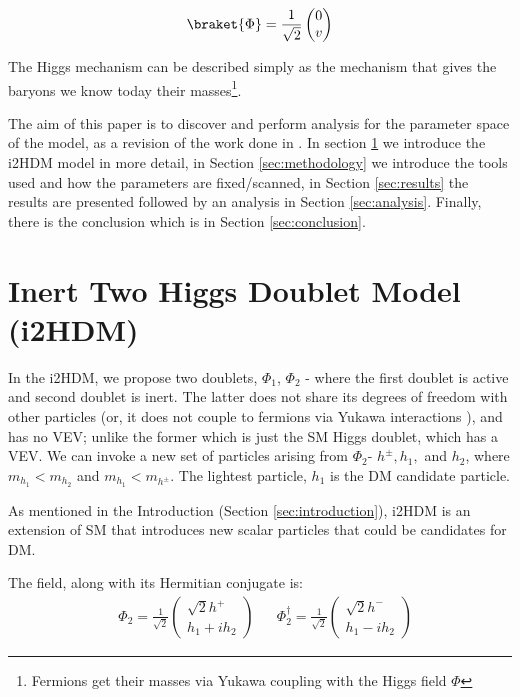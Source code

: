 \documentclass[12pt]{article}
\begin{document}
\begin{equation}
    \braket{\Phi} = \frac{1}{\sqrt{2}}
    \begin{pmatrix}
        0\\
        v
    \end{pmatrix}
\end{equation}

The Higgs mechanism can be described simply as the mechanism that gives the baryons we know today their masses\footnote{Fermions get their masses via Yukawa coupling with the Higgs field $\Phi$}.

The aim of this paper is to discover and perform analysis for the parameter space of the model, as a revision of the work done in \cite{Belyaev:2016lok}. In section \ref{sec:i2HDM} we introduce the i2HDM model in more detail, in Section \ref{sec:methodology} we introduce the tools used and how the parameters are fixed/scanned, in Section \ref{sec:results} the results are presented followed by an analysis in Section \ref{sec:analysis}. Finally, there is the conclusion which is in Section \ref{sec:conclusion}.

\section{Inert Two Higgs Doublet Model (i2HDM)}
\label{sec:i2HDM}
In the i2HDM, we propose two doublets, $\Phi_1$, $\Phi_2$ - where the first doublet is active and second doublet is inert. The latter does not share its degrees of freedom with other particles (or, it does not couple to fermions via Yukawa interactions \cite{Belyaev_2022}), and has no VEV; unlike the former which is just the SM Higgs doublet, which has a VEV. We can invoke a new set of particles arising from $\Phi_2$- $h^\pm, h_1,$ and $h_2$, where $m_{h_1} < m_{h_2}$ and $m_{h_1} < m_{h^\pm}$. The lightest particle, $h_1$ is the DM candidate particle.

As mentioned in the Introduction (Section \ref{sec:introduction}), i2HDM is an extension of SM that introduces new scalar particles that could be candidates for DM.

The field, along with its Hermitian conjugate is:
\begin{align}
    &\Phi_2 = \frac{1}{\sqrt{2}}
        \begin{pmatrix}
            {\sqrt{2}h^+} \\
            {h_1 + ih_2 }
        \end{pmatrix}&
    &\Phi_2^\dagger = \frac{1}{\sqrt{2}} 
        \begin{pmatrix}
            {\sqrt{2}h^-} \\
            {h_1 - ih_2 }
        \end{pmatrix}
\end{align} 
\end{document}
